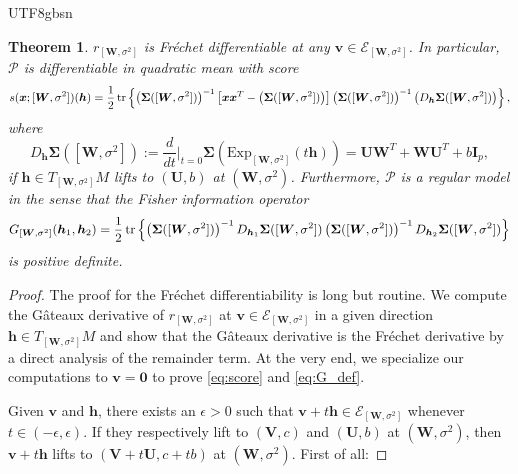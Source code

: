 \documentclass[12pt]{report}
\newcommand{\bracket}[1]{\left ( #1 \right )}
\newcommand{\curly}[1]{\left \{ #1 \right \} }
\newcommand{\squared}[1]{\left [ #1 \right ]}
\theoremstyle{plain}
\newtheorem{theorem}{Theorem}
\theoremstyle{definition}
\begin{document}
\begin{CJK*}{UTF8}{gbsn}
\begin{theorem}\label{thm:DQM}
$r_{[\bm{W},\sigma^2]}$ is Fréchet differentiable at any $\bm{v} \in \mathcal{E}_{[\bm{W},\sigma^2]}$.
In particular, $\mathcal{P}$ is differentiable in quadratic mean with score
\begin{equation}\label{eq:score}
  s(\bm{x}; [\bm{W},\sigma^2])(\bm{h})
  = \frac{1}{2}\tr \curly{\bracket{\bm{\Sigma}([\bm{W},\sigma^2])}^{-1}
  \squared{\bm{x}\bm{x}^T - \bracket{\bm{\Sigma}([\bm{W},\sigma^2])}}
  \bracket{\bm{\Sigma}([\bm{W},\sigma^2])}^{-1} \bracket{D_{\bm{h}}\bm{\Sigma}([\bm{W},\sigma^2])}},
\end{equation}
where
\begin{equation}\label{eq:Sigma_directional}
  D_{\bm{h}}\bm{\Sigma}([\bm{W},\sigma^2])
  := \frac{d}{dt}\bigg|_{t=0} \bm{\Sigma}(\text{Exp}_{[\bm{W},\sigma^2]}(t\bm{h}))
  = \bm{U}\bm{W}^T + \bm{W}\bm{U}^T + b  \bm{I}_p,
\end{equation}
if $\bm{h}\in T_{[\bm{W},\sigma^2]}M$ lifts to $(\bm{U},b)$ at $(\bm{W},\sigma^2)$.
Furthermore, $\mathcal{P}$ is a regular model in the sense that
the Fisher information operator
\begin{equation}\label{eq:G_def}
  G_{[\bm{W},\sigma^2]} (\bm{h}_1,\bm{h}_2)
  = \frac{1}{2}\tr \curly{\bracket{\bm{\Sigma}([\bm{W},\sigma^2])}^{-1}
  D_{\bm{h}_1}\bm{\Sigma}([\bm{W},\sigma^2])
  \bracket{\bm{\Sigma}([\bm{W},\sigma^2])}^{-1}
  D_{\bm{h}_2}\bm{\Sigma}([\bm{W},\sigma^2])}
\end{equation}
 is positive definite.
\end{theorem}

\begin{proof}
The proof for the Fréchet differentiability
is long but routine.
We compute the Gâteaux derivative
of $r_{[\bm{W},\sigma^2]}$ at $\bm{v} \in \mathcal{E}_{[\bm{W},\sigma^2]}$
in a given direction $\bm{h} \in T_{[\bm{W},\sigma^2]}M$
and show that the Gâteaux derivative is the Fréchet derivative 
by a direct analysis of the remainder term.
At the very end, we specialize our computations to 
$\bm{v} = \bm{0}$ to prove \eqref{eq:score}
and \eqref{eq:G_def}.

Given $\bm{v}$ and $\bm{h}$,
there exists an $\epsilon > 0$ such that
$\bm{v} + t\bm{h} \in \mathcal{E}_{[\bm{W},\sigma^2]}$
whenever $t \in (-\epsilon, \epsilon)$.
If they respectively lift to $(\bm{V},c)$
and $(\bm{U},b)$ at $(\bm{W},\sigma^2)$,
then $\bm{v} + t\bm{h}$ lifts to $(\bm{V} + t\bm{U},c+tb)$
at $(\bm{W},\sigma^2)$.
First of all:


\end{proof}
\end{CJK*}
\end{document}
